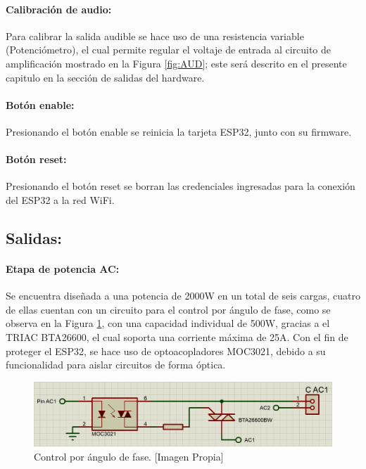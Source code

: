 	\paragraph{Calibración de audio:}
		Para calibrar la salida audible se hace uso de una resistencia variable (Potenciómetro), el cual permite regular el voltaje de entrada al circuito de amplificación mostrado en la Figura \ref{fig:AUD}; este será descrito en el presente capitulo en la sección de salidas del hardware.\\ 
		
	\paragraph{Botón enable:}
		Presionando el botón enable se reinicia la tarjeta ESP32, junto con su firmware.\\
		
	\paragraph{Botón reset:}
		Presionando el botón reset se borran las credenciales ingresadas para la conexión del ESP32 a la red WiFi.\\
		
	\subsection{Salidas:}
	\paragraph{Etapa de potencia AC:}
		Se encuentra diseñada a una potencia de 2000W en un total de seis cargas, cuatro de ellas cuentan con un circuito para el control por ángulo de fase, como se observa en la Figura \ref{fig:CAC1}, con una capacidad individual de 500W, gracias a el TRIAC BTA26600, el cual soporta una corriente máxima de 25A. Con el fin de proteger el ESP32, se hace uso de optoacopladores MOC3021, debido a su funcionalidad para aislar circuitos de forma óptica.\\
		
		\begin{figure}[H]
			\centering
			\caption[Control por ángulo de fase.]{Control por ángulo de fase.  [Imagen Propia]}
			\label{fig:CAC1}
			\includegraphics[width=0.8\linewidth]{Imagenes/CAC1}
		\end{figure}
	

